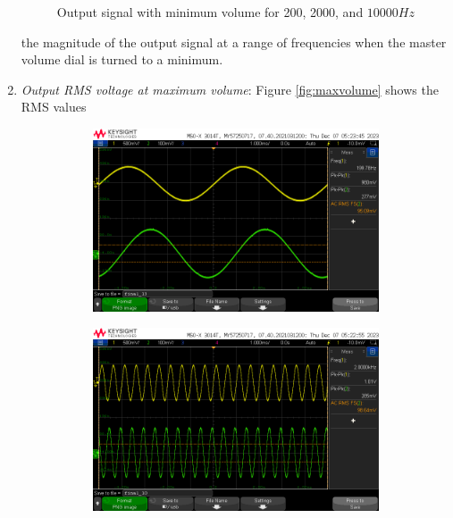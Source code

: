 \documentclass[notitlepage, 12pt]{report}
\begin{document}
\begin{enumerate}
\begin{figure}
        \caption{Output signal with minimum volume for 200, 2000, and $10000Hz$}
        \label{fig:minvolume}
    \end{figure}
    the magnitude of the output signal at a range of frequencies when the master volume dial is 
    turned to a minimum.
    \item \emph{Output RMS voltage at maximum volume}: Figure \ref{fig:maxvolume} shows the RMS values 
    \begin{figure}    
        \begin{subfigure}{0.3\textwidth}
            \includegraphics[scale=0.2]{images/maxvollow.png}
        \end{subfigure}
        \hfill
        \begin{subfigure}{0.3\textwidth}
            \includegraphics[scale=0.2]{images/maxvolmed.png}
        \end{subfigure}
        \hfill
        \begin{subfigure}{0.3\textwidth}

\end{subfigure}
\end{figure}
\end{enumerate}
\end{document}
